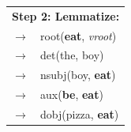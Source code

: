 \documentclass[handout,xcolor={dvipsnames}]{beamer}
\begin{document}
\begin{frame}
\begin{columns}
\pause
{}
\begin{table}
\begin{tabular}{cl}
\multicolumn{2}{c}{\textbf{Step 2: Lemmatize:}} \\
$\rightarrow$ & root(\textbf{eat}, \textit{vroot}) \\
$\rightarrow$ & det(the, boy) \\
$\rightarrow$ & nsubj(boy, \textbf{eat}) \\
$\rightarrow$ & aux(\textbf{be}, \textbf{eat}) \\
$\rightarrow$ & dobj(pizza, \textbf{eat}) \\
\end{tabular}
\end{table}


\end{columns}

\end{frame}
\end{document}
